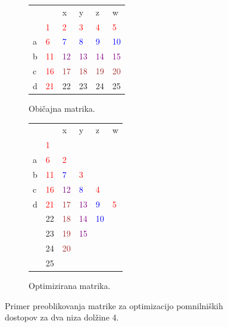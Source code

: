 \documentclass[a4paper,12pt,openright]{book}
\begin{document}
\begin{figure}[H]

\begin{subfigure}{.5\textwidth}
\centering
\begin{tabular}{|l|l|l|l|l|l|}
\cline{3-6}
  \multicolumn{2}{c|}{}  & x & y & z & w\\ \cline{2-6}
 \multicolumn{1}{c|}{} & \textcolor{red}{1} & \textcolor{red}{2} & \textcolor{red}{3} & \textcolor{red}{4} & \textcolor{red}{5}\\ \hline
a  & \textcolor{red}{6} & \textcolor{blue}{7} & \textcolor{blue}{8} & \textcolor{blue}{9} & \textcolor{blue}{10}\\ \hline
b  & \textcolor{red}{11} & \textcolor{purple}{12} & \textcolor{purple}{13} & \textcolor{purple}{14} & \textcolor{purple}{15}\\ \hline
c  & \textcolor{red}{16} & \textcolor{brown}{17} & \textcolor{brown}{18} & \textcolor{brown}{19} & \textcolor{brown}{20} \\ \hline
d  & \textcolor{red}{21} & 22 & 23 & 24 & 25 \\ \hline
\end{tabular}
\caption{Običajna matrika.}
\label{normalMatrix}
\end{subfigure}%
\begin{subfigure}{.5\textwidth}
\centering
\begin{tabular}{|l|l|l|l|l|l|}
\cline{3-6}
  \multicolumn{2}{c|}{}  & x & y & z & w \\ \cline{2-6}
 \multicolumn{1}{c|}{} & \textcolor{red}{1} & \multicolumn{4}{c}{} \\ \cline{1-3}
a  & \textcolor{red}{6} & \textcolor{red}{2} &  \multicolumn{3}{c}{} \\ \cline{1-4}
b  & \textcolor{red}{11} & \textcolor{blue}{7} & \textcolor{red}{3} & \multicolumn{2}{c}{}  \\ \cline{1-5}
c  & \textcolor{red}{16} & \textcolor{purple}{12} & \textcolor{blue}{8} & \textcolor{red}{4} & \multicolumn{1}{c}{} \\ \cline{1-6}
d  & \textcolor{red}{21} & \textcolor{brown}{17} & \textcolor{purple}{13} & \textcolor{blue}{9} & \textcolor{red}{5} \\ \hline
 \multicolumn{1}{c|}{} & 22 & \textcolor{brown}{18} & \textcolor{purple}{14} & \textcolor{blue}{10} & \multicolumn{1}{c}{}  \\ \cline{2-5}
\multicolumn{1}{c|}{}  & 23 & \textcolor{brown}{19} & \textcolor{purple}{15} & \multicolumn{2}{c}{}   \\ \cline{2-4}
\multicolumn{1}{c|}{}  & 24 & \textcolor{brown}{20} &  \multicolumn{3}{c}{}   \\ \cline{2-3}
\multicolumn{1}{c|}{}  & 25 & \multicolumn{4}{c}{}  \\ \cline{2-2}
\end{tabular}
\caption{Optimizirana matrika.}
\label{diagonalMatrix}
\end{subfigure}%

\caption{Primer preoblikovanja matrike za optimizacijo pomnilniških dostopov za dva niza dolžine 4.}
\label{matrixTransformation}
\end{figure}
\end{document}

